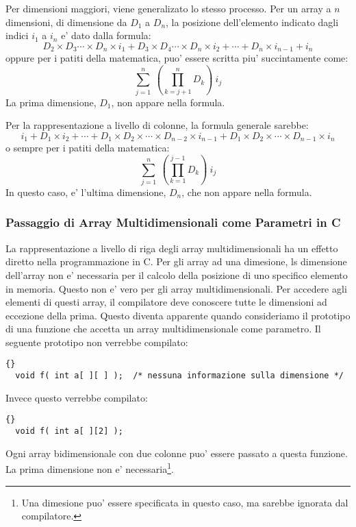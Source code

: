 Per dimensioni maggiori, viene generalizato lo stesso processo. Per un array
a $n$ dimensioni, di dimensione da $D_1$ a $D_n$, la posizione dell'elemento
indicato dagli indici $i_1$ a $i_n$ e' dato dalla formula:
\begin{displaymath}
D_2 \times D_3 \cdots \times D_n \times i_1 + D_3 \times D_4 \cdots \times D_n 
\times i_2 + \cdots + D_n \times i_{n-1} + i_n
\end{displaymath}
oppure per i patiti della matematica, puo' essere scritta piu' succintamente
come:   
\begin{displaymath}
\sum_{j=1}^{n} \: \left( \prod_{k=j+1}^{n} D_k \right) \: i_j
\end{displaymath}
La prima dimensione, $D_1$, non appare nella formula.

Per la rappresentazione a livello di colonne, la formula generale sarebbe:
\begin{displaymath}
i_1 + D_1 \times i_2 + \cdots + D_1 \times D_2 \times \cdots \times D_{n-2} 
\times i_{n-1} + D_1 \times D_2 \times \cdots \times D_{n-1} \times i_n
\end{displaymath}
o sempre per i patiti della matematica:
\begin{displaymath}
\sum_{j=1}^{n} \: \left( \prod_{k=1}^{j-1} D_k \right) \: i_j
\end{displaymath}
In questo caso, e' l'ultima dimensione, $D_n$, che non appare nella formula.

\subsubsection{Passaggio di Array Multidimensionali come Parametri in C}

La rappresentazione a livello di riga degli array multidimensionali ha
un effetto diretto nella programmazione in C. Per gli array ad una dimesione,
ls dimensione dell'array non e' necessaria per il calcolo della posizione
di uno specifico elemento in memoria. Questo non e' vero per gli array
multidimensionali. Per accedere agli elementi di questi array, il 
compilatore deve conoscere tutte le dimensioni ad eccezione della prima.
Questo diventa apparente quando consideriamo il prototipo di una funzione
che accetta un array multidimensionale come parametro. Il seguente prototipo
non verrebbe compilato:
\begin{lstlisting}[stepnumber=0]{}
  void f( int a[ ][ ] );  /* nessuna informazione sulla dimensione */
\end{lstlisting}
Invece questo verrebbe compilato:
\begin{lstlisting}[stepnumber=0]{}
  void f( int a[ ][2] );
\end{lstlisting}
Ogni array bidimensionale con due colonne puo' essere passato a questa funzione. 
La prima dimensione non e' necessaria\footnote{Una dimesione puo' essere
specificata in questo caso, ma sarebbe ignorata dal compilatore.}.

